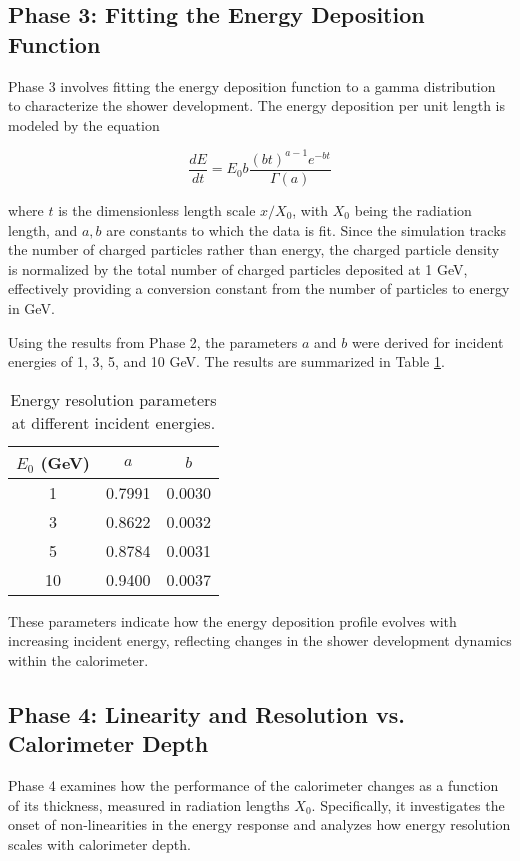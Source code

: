 \documentclass[twocolumn]{aastex631}
\begin{document}
\subsection{Phase 3: Fitting the Energy Deposition Function} 

Phase 3 involves fitting the energy deposition function to a gamma distribution
to characterize the shower development. The energy deposition per unit length is
modeled by the equation 

\[ \frac{dE}{dt} = E_0 b \frac{(bt)^{a-1} e^{-bt}}{\Gamma(a)} \] 

where $t$ is the dimensionless length scale $x/X_0$, with $X_0$ being the
radiation length, and $a,b$ are constants to which the data is fit. Since the
simulation tracks the number of charged particles rather than energy, the
charged particle density is normalized by the total number of charged particles
deposited at 1 GeV, effectively providing a conversion constant from the number
of particles to energy in GeV. 

Using the results from Phase 2, the parameters $a$ and $b$ were derived for
incident energies of 1, 3, 5, and 10 GeV. The results are summarized in Table
\ref{tab:3}.


\begin{table}[htp]
\centering
\begin{tabular}{c||c|c}
$E_0$ (GeV) & $a$    & $b$    \\
\hline
1           & 0.7991 & 0.0030 \\
3           & 0.8622 & 0.0032 \\
5           & 0.8784 & 0.0031 \\
10          & 0.9400 & 0.0037 \\
\end{tabular}
\caption{Energy resolution parameters at different incident energies.}
\label{tab:3}
\end{table}

These parameters indicate how the energy deposition profile evolves with
increasing incident energy, reflecting changes in the shower development
dynamics within the calorimeter. 

\subsection{Phase 4: Linearity and Resolution vs. Calorimeter Depth} 

Phase 4 examines how the performance of the calorimeter changes as a function of
its thickness, measured in radiation lengths $X_0$. Specifically, it
investigates the onset of non-linearities in the energy response and analyzes
how energy resolution scales with calorimeter depth.
\end{document}
